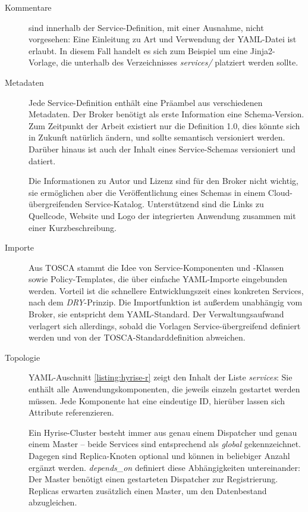 \begin{description}
	
	\item[Kommentare] sind innerhalb der Service-Definition, mit einer Ausnahme, nicht vorgesehen: Eine Einleitung zu Art und Verwendung der YAML-Datei ist erlaubt. In diesem Fall handelt es sich zum Beispiel um eine Jinja2-Vorlage, die unterhalb des Verzeichnisses \emph{services/} platziert werden sollte.
	
	\item[Metadaten] Jede Service-Definition enthält eine Präambel aus verschiedenen Metadaten. Der Broker benötigt als erste Information eine Schema-Version. Zum Zeitpunkt der Arbeit existiert nur die Definition 1.0, dies könnte sich in Zukunft natürlich ändern, und sollte semantisch versioniert werden. Darüber hinaus ist auch der Inhalt eines Service-Schemas versioniert und datiert. 
	
	Die Informationen zu Autor und Lizenz sind für den Broker nicht wichtig, sie ermöglichen aber die Veröffentlichung eines Schemas in einem Cloud-übergreifenden Service-Katalog. Unterstützend sind die Links zu Quellcode, Website und Logo der integrierten Anwendung zusammen mit einer Kurzbeschreibung.

	\item[Importe] Aus TOSCA stammt die Idee von Service-Komponenten und -Klassen sowie Policy-Templates, die über einfache YAML-Importe eingebunden werden. Vorteil ist die schnellere Entwicklungszeit eines konkreten Services, nach dem \emph{DRY}-Prinzip. Die Importfunktion ist außerdem unabhängig vom Broker, sie entspricht dem YAML-Standard. Der Verwaltungsaufwand verlagert sich allerdings, sobald die Vorlagen Service-übergreifend definiert werden und von der TOSCA-Standarddefinition abweichen.
	
	\item[Topologie] YAML-Auschnitt \ref{listing:hyrise-r} zeigt den Inhalt der Liste \emph{services}: Sie enthält alle Anwendungskomponenten, die jeweils einzeln gestartet werden müssen. Jede Komponente hat eine eindeutige ID, hierüber lassen sich Attribute referenzieren.
	
	Ein Hyrise-Cluster besteht immer aus genau einem Dispatcher und genau einem Master -- beide Services sind entsprechend als \emph{global} gekennzeichnet. Dagegen sind Replica-Knoten optional und können in beliebiger Anzahl ergänzt werden. \emph{depends\_on} definiert diese Abhängigkeiten untereinander: Der Master benötigt einen gestarteten Dispatcher zur Registrierung. Replicas erwarten zusätzlich einen Master, um den Datenbestand abzugleichen.	
	

\end{description}
